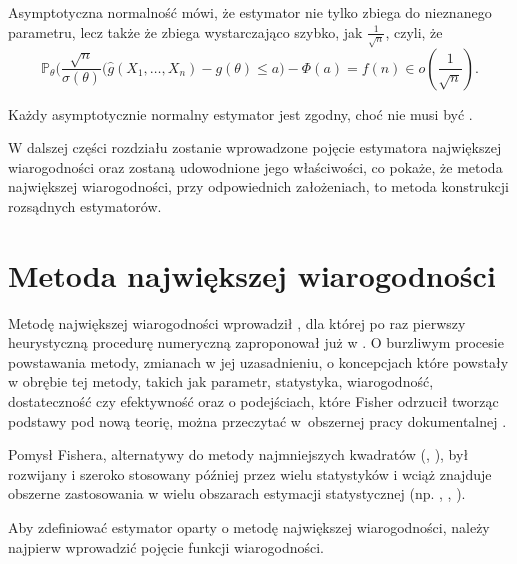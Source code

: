 Asymptotyczna normalność mówi, że estymator nie tylko zbiega do nieznanego parametru, lecz także że zbiega wystarczająco szybko, jak $\frac{1}{\sqrt{n}}$, czyli, że 
$$\mathbb{P}_{\theta} \Big(\dfrac{\sqrt{n}}{\sigma(\theta)}(\hat{g}(X_1,\dots,X_n) -g(\theta) \leq a \Big) - \Phi(a) = f(n) \in o(\frac{1}{\sqrt{n}}) . $$ 

Każdy asymptotycznie normalny estymator jest zgodny, choć nie musi być \textit{}.

W dalszej części rozdziału zostanie wprowadzone pojęcie estymatora największej wiarogodności oraz zostaną udowodnione jego właściwości, co pokaże, że metoda największej wiarogodności, przy odpowiednich założeniach, to metoda konstrukcji rozsądnych estymatorów.

\newpage 

\section{Metoda największej wiarogodności}

Metodę największej wiarogodności wprowadził \cite{fisher2}, dla której po raz pierwszy heurystyczną procedurę numeryczną zaproponował już w \cite{fisher1}. O burzliwym procesie powstawania metody, zmianach w jej uzasadnieniu, o koncepcjach które powstały w obrębie tej metody, takich jak parametr, statystyka, wiarogodność, dostateczność czy efektywność oraz o podejściach, które Fisher odrzucił tworząc podstawy pod nową teorię, można przeczytać w~obszernej pracy dokumentalnej \citet{aldrich1}. 

Pomysł Fishera, alternatywy do metody najmniejszych kwadratów (\cite{legendre1}, \cite{gauss1}), był rozwijany i szeroko stosowany później przez wielu statystyków i wciąż znajduje obszerne zastosowania w wielu obszarach estymacji statystycznej (np. \cite{hutch1}, \cite{kenward1}, \cite{millar1}).

Aby zdefiniować estymator oparty o metodę największej wiarogodności, należy najpierw wprowadzić pojęcie funkcji wiarogodności.


